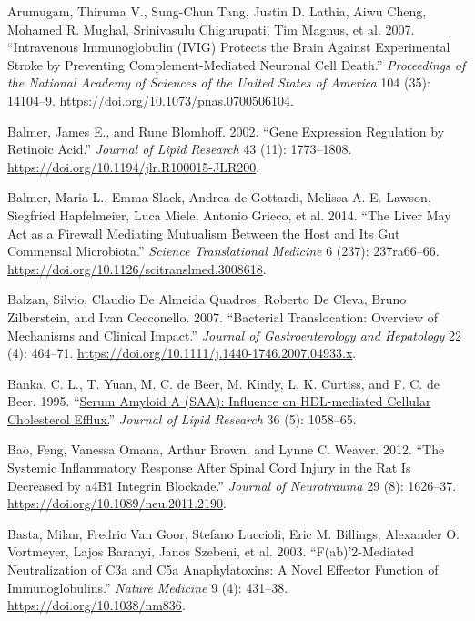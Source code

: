 \documentclass[9pt,lineno]{elife}
\newlength{\cslhangindent}
\newlength{\cslentryspacingunit} %
\newenvironment{CSLReferences}[2] %
 {%
  \setlength{\parindent}{0pt}
  \ifodd #1
  \let\oldpar\par
  \def\par{\hangindent=\cslhangindent\oldpar}
  \fi
  \setlength{\parskip}{#2\cslentryspacingunit}
 }%
 {}
\begin{document}
\begin{landscape}
\begin{landscape}
\begin{landscape}
\begin{landscape}
\begin{CSLReferences}{1}{0}
\leavevmode{}%
Arumugam, Thiruma V., Sung-Chun Tang, Justin D. Lathia, Aiwu Cheng, Mohamed R. Mughal, Srinivasulu Chigurupati, Tim Magnus, et al. 2007. {``Intravenous Immunoglobulin ({IVIG}) Protects the Brain Against Experimental Stroke by Preventing Complement-Mediated Neuronal Cell Death.''} \emph{Proceedings of the National Academy of Sciences of the United States of America} 104 (35): 14104--9. \url{https://doi.org/10.1073/pnas.0700506104}.

\leavevmode{}%
Balmer, James E., and Rune Blomhoff. 2002. {``Gene Expression Regulation by Retinoic Acid.''} \emph{Journal of Lipid Research} 43 (11): 1773--1808. \url{https://doi.org/10.1194/jlr.R100015-JLR200}.

\leavevmode{}%
Balmer, Maria L., Emma Slack, Andrea de Gottardi, Melissa A. E. Lawson, Siegfried Hapfelmeier, Luca Miele, Antonio Grieco, et al. 2014. {``The {Liver May Act} as a {Firewall Mediating Mutualism Between} the {Host} and {Its Gut Commensal Microbiota}.''} \emph{Science Translational Medicine} 6 (237): 237ra66--66. \url{https://doi.org/10.1126/scitranslmed.3008618}.

\leavevmode{}%
Balzan, Silvio, Claudio De Almeida Quadros, Roberto De Cleva, Bruno Zilberstein, and Ivan Cecconello. 2007. {``Bacterial Translocation: {Overview} of Mechanisms and Clinical Impact.''} \emph{Journal of Gastroenterology and Hepatology} 22 (4): 464--71. \url{https://doi.org/10.1111/j.1440-1746.2007.04933.x}.

\leavevmode{}%
Banka, C. L., T. Yuan, M. C. de Beer, M. Kindy, L. K. Curtiss, and F. C. de Beer. 1995. {``\href{https://www.ncbi.nlm.nih.gov/pubmed/7658153}{Serum Amyloid {A} ({SAA}): Influence on {HDL-mediated} Cellular Cholesterol Efflux.}''} \emph{Journal of Lipid Research} 36 (5): 1058--65.

\leavevmode{}%
Bao, Feng, Vanessa Omana, Arthur Brown, and Lynne C. Weaver. 2012. {``The Systemic Inflammatory Response After Spinal Cord Injury in the Rat Is Decreased by {a4B1} Integrin Blockade.''} \emph{Journal of Neurotrauma} 29 (8): 1626--37. \url{https://doi.org/10.1089/neu.2011.2190}.

\leavevmode{}%
Basta, Milan, Fredric Van Goor, Stefano Luccioli, Eric M. Billings, Alexander O. Vortmeyer, Lajos Baranyi, Janos Szebeni, et al. 2003. {``F(ab)'2-Mediated Neutralization of {C3a} and {C5a} Anaphylatoxins: A Novel Effector Function of Immunoglobulins.''} \emph{Nature Medicine} 9 (4): 431--38. \url{https://doi.org/10.1038/nm836}.


\end{CSLReferences}
\end{landscape}
\end{landscape}
\end{landscape}
\end{landscape}
\end{document}

